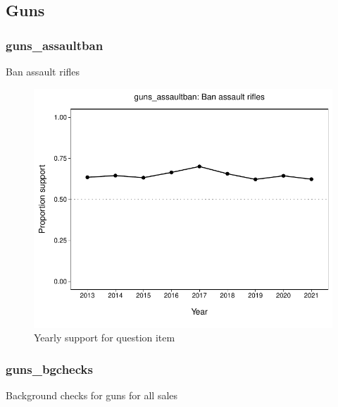\documentclass[
  12pt]{article}
\begin{document}
\newpage

\hypertarget{guns}{%
\subsection{Guns}\label{guns}}

\hypertarget{guns_assaultban}{%
\subsubsection{guns\_assaultban}\label{guns_assaultban}}

Ban assault rifles

\begin{figure}

{\centering \includegraphics{error-checking_files/figure-latex/unnamed-chunk-3-12} 

}

\caption{Yearly support for question item}\label{fig:unnamed-chunk-3-12}
\end{figure}

\hypertarget{guns_bgchecks}{%
\subsubsection{guns\_bgchecks}\label{guns_bgchecks}}

Background checks for guns for all sales
\end{document}
